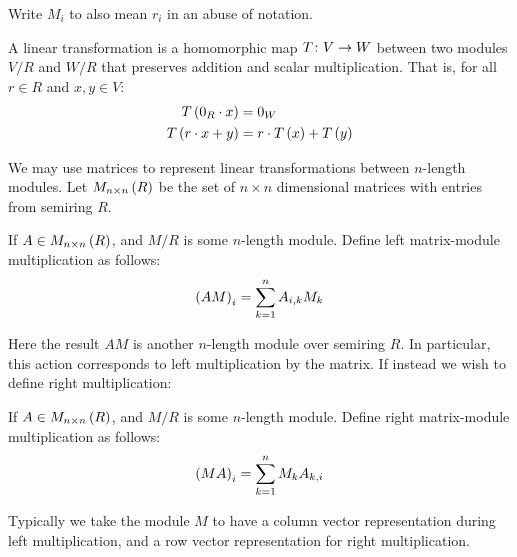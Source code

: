 Write \(M_i\) to also mean \(r_i\) in an abuse of notation.

\begin{definition}
  A linear transformation is a homomorphic map
  \(T \colon V \to W\) between two modules \(V / R\) and \(W / R\)
  that preserves addition and scalar multiplication.
  That is,
  for all \(r \in R\) and \(x, y \in V\):
  \begin{align*}
    T\left(0_R \cdot x\right)
      &= 0_W \\
    T\left(r\cdot x + y\right)
      &= r\cdot T\left(x\right) + T\left(y\right)
  \end{align*}
\end{definition}

We may use matrices to represent linear transformations
between \(n\)-length modules.
Let \(M_{n \times n} \left(R\right)\)
be the set of \(n \times n\) dimensional
matrices with entries from semiring \(R\).

\begin{definition}
If \(A \in M_{n \times n}\left(R\right)\),
and \(M / R\) is some \(n\)-length module.
Define left matrix-module multiplication as follows:
\begin{align*}
  \left(AM\right)_{i}
    = \sum_{k = 1}^{n} A_{i, k} M_k
\end{align*}
\end{definition}

Here the result \(AM\) is another \(n\)-length module over semiring \(R\).
In particular, this action corresponds to left multiplication by the matrix.
If instead we wish to define right multiplication:

\begin{definition}
If \(A \in M_{n \times n}\left(R\right)\),
and \(M / R\) is some \(n\)-length module.
Define right matrix-module multiplication as follows:
\begin{align*}
  \left(MA\right)_{i}
    = \sum_{k = 1}^{n} M_k A_{k, i}
\end{align*}
\end{definition}

Typically we take the module \(M\) to have a column vector representation
during left multiplication,
and a row vector representation for right multiplication.

